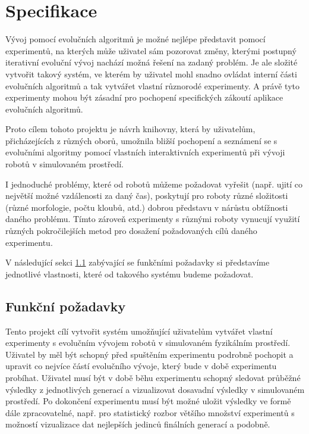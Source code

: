 \chapter{Specifikace} \label{chapter-specifikace}

Vývoj pomocí evolučních algoritmů je možné nejlépe představit pomocí
experimentů, na kterých může uživatel sám pozorovat změny, kterými postupný
iterativní evoluční vývoj nachází možná řešení na zadaný problém. Je ale
složité vytvořit takový systém, ve kterém by uživatel mohl snadno ovládat
interní části evolučních algoritmů a tak vytvářet vlastní různorodé
experimenty. A právě tyto experimenty mohou být zásadní pro pochopení
specifických zákoutí aplikace evolučních algoritmů.

Proto cílem tohoto projektu je návrh knihovny, která by uživatelům,
přicházejících z různých oborů, umožnila bližší pochopení a seznámení se s
evolučními algoritmy pomocí vlastních interaktivních experimentů při vývoji
robotů v simulovaném prostředí. 

I jednoduché problémy, které od robotů můžeme požadovat vyřešit (např. ujití co
největší možné vzdálenosti za daný čas), poskytují pro roboty různé složitosti
(různé morfologie, počtu kloubů, atd.) dobrou představu v nárůstu obtížnosti
daného problému. Tímto zároveň experimenty s různými roboty vynucují využití
různých pokročilejších metod pro dosažení požadovaných cílů daného experimentu.

V následující sekci \ref{Specifikace-funkčnípožadavky} zabývající se funkčními
požadavky si představíme jednotlivé vlastnosti, které od takového systému
budeme požadovat.

\section{Funkční požadavky} \label{Specifikace-funkčnípožadavky}

Tento projekt cílí vytvořit systém umožňující uživatelům vytvářet vlastní
experimenty s evolučním vývojem robotů v simulovaném fyzikálním prostředí.
Uživatel by měl být schopný před spuštěním experimentu podrobně pochopit a
upravit co nejvíce částí evolučního vývoje, který bude v době experimentu
probíhat. Uživatel musí být v době běhu experimentu schopný sledovat průběžné
výsledky z jednotlivých generací a vizualizovat dosavadní výsledky v
simulovaném prostředí. Po dokončení experimentu musí být možné uložit
výsledky ve formě dále zpracovatelné, např. pro statistický rozbor většího
množství experimentů s možností vizualizace dat nejlepších jedinců finálních
generací a podobně.

